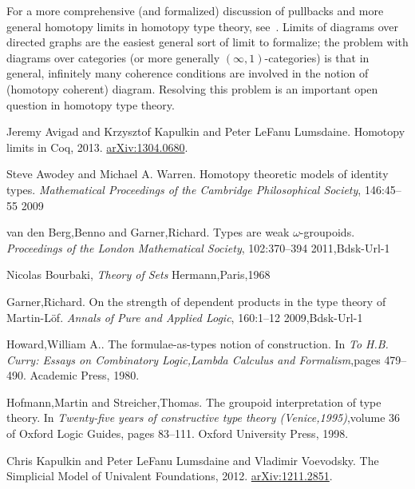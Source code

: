 \documentclass[12pt]{article}
\newcommand{\indexsee}[2]{\index{#1|see{#2}}}
\begin{document}
For a more comprehensive (and formalized) discussion of pullbacks and more general homotopy limits in homotopy type theory, see~\cite{AKL13}.
Limits of diagrams over directed graphs are the easiest general sort of limit to formalize; the problem with diagrams over categories (or more generally $(\infty,1)$-categories)
%
\indexsee{category!.infinity1-@$(\infty,1)$-}{$(\infty,1)$-category}%
is that in general, infinitely many coherence conditions are involved in the notion of (homotopy coherent) diagram.
Resolving this problem is an important open question in homotopy type theory.

\begin{thebibliography}{99}

 {Jeremy Avigad and Krzysztof Kapulkin and Peter LeFanu Lumsdaine}. {Homotopy limits in {C}oq}, {2013}. {\href{http://arxiv.org/abs/1304.0680/}{arXiv:1304.0680}}.

 {Steve Awodey and Michael A. Warren}. {Homotopy theoretic models of identity types}. \emph{Mathematical Proceedings of the Cambridge Philosophical Society}, {146}:{45--55} {2009}

 {van den Berg,Benno and Garner,Richard}. {Types are weak $\omega$-groupoids}. \emph{Proceedings of the London Mathematical Society}, {102}:{370--394} {2011},Bdsk-Url-1

 {Nicolas Bourbaki}, \emph{{Theory of Sets}}  {Hermann,Paris},{1968}

 {Garner,Richard}. {On the strength of dependent products in the type theory of {M}artin-{L}\"of}. \emph{Annals of Pure and Applied Logic}, {160}:{1--12} {2009},Bdsk-Url-1

 {Howard,William A.}. {The formulae-as-types notion of construction}. In \emph{To H.B. Curry: Essays on Combinatory Logic,Lambda Calculus and Formalism},pages {479--490}. {Academic Press}, {1980}.

 {Hofmann,Martin and Streicher,Thomas}. {The groupoid interpretation of type theory}. In \emph{Twenty-five years of constructive type theory ({V}enice,1995)},volume 36 of {Oxford Logic Guides}, pages {83--111}. {Oxford University Press}, 1998.

 {Chris Kapulkin and Peter LeFanu Lumsdaine and Vladimir Voevodsky}. {The Simplicial Model of Univalent Foundations}, 2012. {\href{http://arxiv.org/abs/1211.2851/}{arXiv:1211.2851}}.


\end{thebibliography}
\end{document}
